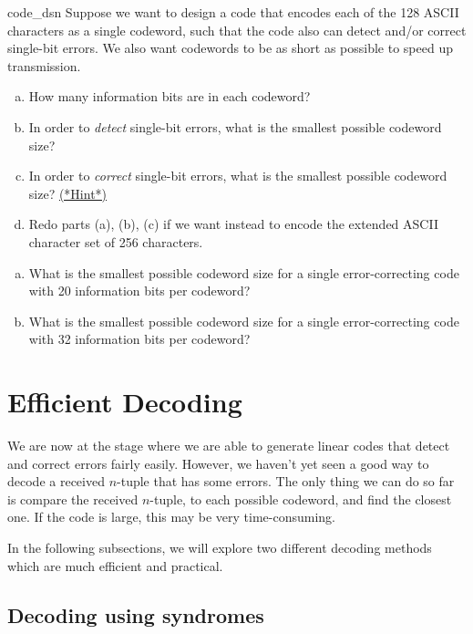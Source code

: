  \begin{exercise}{code_dsn}
 Suppose we want to design a code that encodes each of the 128 ASCII characters as a single codeword, such that the code also can detect and/or correct single-bit errors. We also want codewords to be as short as possible to speed up transmission. 
 \begin{enumerate}[(a)]
 \item
 How many information bits are in each codeword?
 \item
 In order to \emph{detect} single-bit errors, what is the smallest possible codeword size?
\item
 In order to \emph{correct} single-bit errors, what is the smallest possible codeword size?  \hyperref[sec:algcodes:hints]{(*Hint*)}

\item
Redo parts (a), (b), (c) if we want instead to encode the extended ASCII character set of 256 characters.
\end{enumerate}
\end{exercise}

\begin{exercise}{}
\begin{enumerate}[(a)]
\item
What is the smallest possible codeword size for a single error-correcting code with 20 information bits per codeword? 
\item
What is the smallest possible codeword size for a single error-correcting code with 32 information bits per codeword? 
\end{enumerate}
\end{exercise}

\section{Efficient Decoding}
 
 
We are now at the stage where we are able to generate linear codes
that detect and correct errors fairly easily. However, we haven't yet seen  a good way 
 to decode a received $n$-tuple that has some errors. The only thing we can do so far is compare  the received $n$-tuple, 
to each possible codeword, and find the closest one.
If the code is large, this may be very time-consuming. 

In the following subsections, we will explore two different decoding methods which are much efficient and practical.
 
\subsection{Decoding using syndromes}

